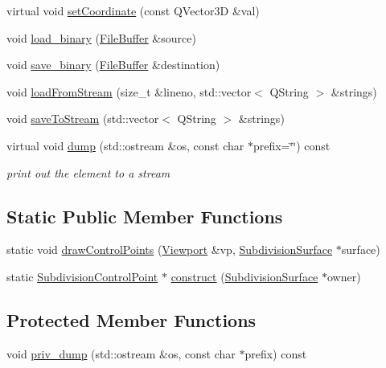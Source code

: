 \begin{DoxyCompactItemize}
virtual void \hyperlink{classShipCADGeometry_1_1SubdivisionControlPoint_a54a5233e02ef34a174c24d5dcf3c6407}{set\-Coordinate} (const Q\-Vector3\-D \&val)
\item 
void \hyperlink{classShipCADGeometry_1_1SubdivisionControlPoint_a989c801ca1c836ca73f77c68d719f546}{load\-\_\-binary} (\hyperlink{classShipCADGeometry_1_1FileBuffer}{File\-Buffer} \&source)
\item 
void \hyperlink{classShipCADGeometry_1_1SubdivisionControlPoint_a7de1a32ae9e845478ec1bd5eaec17cd1}{save\-\_\-binary} (\hyperlink{classShipCADGeometry_1_1FileBuffer}{File\-Buffer} \&destination)
\item 
void \hyperlink{classShipCADGeometry_1_1SubdivisionControlPoint_a09769bfb0b63980387c23736081acdf1}{load\-From\-Stream} (size\-\_\-t \&lineno, std\-::vector$<$ Q\-String $>$ \&strings)
\item 
void \hyperlink{classShipCADGeometry_1_1SubdivisionControlPoint_a60cc866bff57473700fbea4e17adcb4d}{save\-To\-Stream} (std\-::vector$<$ Q\-String $>$ \&strings)
\item 
virtual void \hyperlink{classShipCADGeometry_1_1SubdivisionControlPoint_a4a9d6e45291c27f19f0d76c9b9d19048}{dump} (std\-::ostream \&os, const char $\ast$prefix=\char`\"{}\char`\"{}) const 
\begin{DoxyCompactList}\small\item\em print out the element to a stream \end{DoxyCompactList}\end{DoxyCompactItemize}
\subsection*{Static Public Member Functions}
\begin{DoxyCompactItemize}
\item 
static void \hyperlink{classShipCADGeometry_1_1SubdivisionControlPoint_a761599371138b34be2c7a2cac3699e2c}{draw\-Control\-Points} (\hyperlink{classShipCADGeometry_1_1Viewport}{Viewport} \&vp, \hyperlink{classShipCADGeometry_1_1SubdivisionSurface}{Subdivision\-Surface} $\ast$surface)
\item 
static \hyperlink{classShipCADGeometry_1_1SubdivisionControlPoint}{Subdivision\-Control\-Point} $\ast$ \hyperlink{classShipCADGeometry_1_1SubdivisionControlPoint_adc189f3e5cff85ecd1a59356e0f7d63d}{construct} (\hyperlink{classShipCADGeometry_1_1SubdivisionSurface}{Subdivision\-Surface} $\ast$owner)
\end{DoxyCompactItemize}
\subsection*{Protected Member Functions}
\begin{DoxyCompactItemize}
\item 
void \hyperlink{classShipCADGeometry_1_1SubdivisionControlPoint_a01e1eff38ecb4393948db0d9883cad84}{priv\-\_\-dump} (std\-::ostream \&os, const char $\ast$prefix) const 
\end{DoxyCompactItemize}
